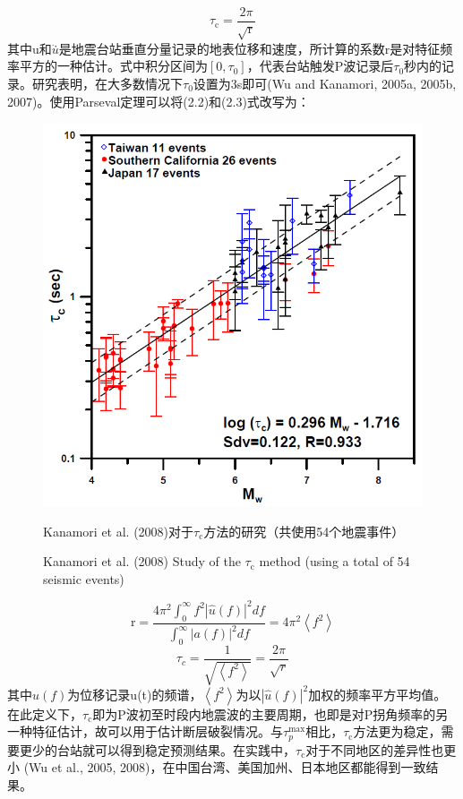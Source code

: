 \begin{equation}
\tau_{\mathrm{c}}=\frac{2 \pi}{\sqrt{\mathrm{r}}}
\end{equation}
其中u和$\dot{u}$̇是地震台站垂直分量记录的地表位移和速度，所计算的系数r是对特征频率平方的一种估计。式中积分区间为$\left[0, \tau_{0}\right]$，代表台站触发P波记录后$\tau_{0}$秒内的记录。研究表明，在大多数情况下$\tau_{0}$设置为3s即可(Wu and Kanamori, 2005a, 2005b, 2007)。使用Parseval定理可以将(2.2)和(2.3)式改写为：
\begin{figure}[!h] 
\centering 
 \includegraphics[width=0.7\linewidth]{img/kanamori2008_taoc.jpg} 
 \renewcommand{\figurename}{图} 
\caption{Kanamori et al. (2008)对于$\tau_{\mathrm{c}}$方法的研究（共使用54个地震事件）} 
\addtocounter{figure}{-1} \vspace{-5pt} 
\renewcommand{\figurename}{Fig} 
\caption{Kanamori et al. (2008) Study of the $\tau_{\mathrm{c}}$ method (using a total of 54 seismic events)} 
\renewcommand{\figurename}{图} 
\label{fig:network-device-influence.png} 
\end{figure}

\begin{equation}
\mathrm{r}=\frac{4 \pi^{2} \int_{0}^{\infty} f^{2}|\widehat{u}(f)|^{2} d f}{\int_{0}^{\infty}|a(f)|^{2} d f}=4 \pi^{2}\left\langle f^{2}\right\rangle
\end{equation}
\begin{equation}
\tau_{c}=\frac{1}{\sqrt{\left\langle f^{2}\right\rangle}}=\frac{2 \pi}{\sqrt{r}}
\end{equation}
其中$\widehat{u}(f)$为位移记录u(t)的频谱，$\left\langle f^{2}\right\rangle$为以$|\hat{u}(f)|^{2}$加权的频率平方平均值。在此定义下，$\tau_{\mathrm{c}}$即为P波初至时段内地震波的主要周期，也即是对P拐角频率的另一种特征估计，故可以用于估计断层破裂情况。与$\tau_{p}^{\max}$相比，$\tau_{\mathrm{c}}$方法更为稳定，需要更少的台站就可以得到稳定预测结果。在实践中，$\tau_{\mathrm{c}}$对于不同地区的差异性也更小 (Wu et al., 2005, 2008)，在中国台湾、美国加州、日本地区都能得到一致结果。\\

